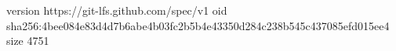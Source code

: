 version https://git-lfs.github.com/spec/v1
oid sha256:4bee084e83d4d7b6abe4b03fc2b5b4e43350d284c238b545c437085efd015ee4
size 4751
